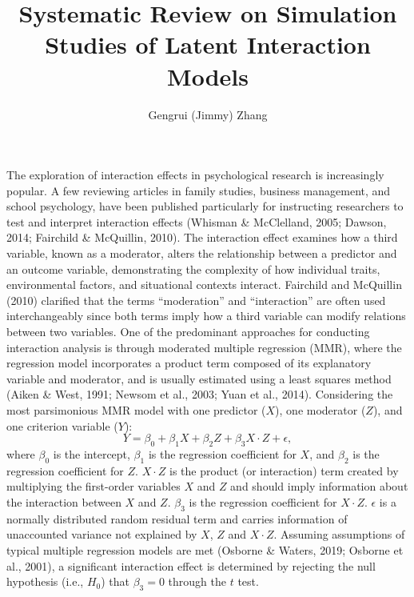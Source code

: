 \documentclass[
  man]{apa7}
\title{Systematic Review on Simulation Studies of Latent Interaction Models}
\author{Gengrui (Jimmy) Zhang\textsuperscript{}}
\date{}
\affiliation{\phantom{0}}
\begin{document}
\maketitle

The exploration of interaction effects in psychological research is increasingly popular. A few reviewing articles in family studies, business management, and school psychology, have been published particularly for instructing researchers to test and interpret interaction effects (Whisman \& McClelland, 2005; Dawson, 2014; Fairchild \& McQuillin, 2010). The interaction effect examines how a third variable, known as a moderator, alters the relationship between a predictor and an outcome variable, demonstrating the complexity of how individual traits, environmental factors, and situational contexts interact. Fairchild and McQuillin (2010) clarified that the terms ``moderation'' and ``interaction'' are often used interchangeably since both terms imply how a third variable can modify relations between two variables. One of the predominant approaches for conducting interaction analysis is through moderated multiple regression (MMR), where the regression model incorporates a product term composed of its explanatory variable and moderator, and is usually estimated using a least squares method (Aiken \& West, 1991; Newsom et al., 2003; Yuan et al., 2014). Considering the most parsimonious MMR model with one predictor (\(X\)), one moderator (\(Z\)), and one criterion variable (\(Y\)):
\begin{equation}
Y = \beta_{0} + \beta_{1}X + \beta_{2}Z + \beta_{3}X \cdot Z + \epsilon,
\end{equation}
where \(\beta_{0}\) is the intercept, \(\beta_{1}\) is the regression coefficient for \(X\), and \(\beta_{2}\) is the regression coefficient for \(Z\). \(X \cdot Z\) is the product (or interaction) term created by multiplying the first-order variables \(X\) and \(Z\) and should imply information about the interaction between \(X\) and \(Z\). \(\beta_{3}\) is the regression coefficient for \(X \cdot Z\). \(\epsilon\) is a normally distributed random residual term and carries information of unaccounted variance not explained by \(X\), \(Z\) and \(X \cdot Z\). Assuming assumptions of typical multiple regression models are met (Osborne \& Waters, 2019; Osborne et al., 2001), a significant interaction effect is determined by rejecting the null hypothesis (i.e., \(H_{0}\)) that \(\beta_{3} = 0\) through the \(t\) test.
\end{document}
